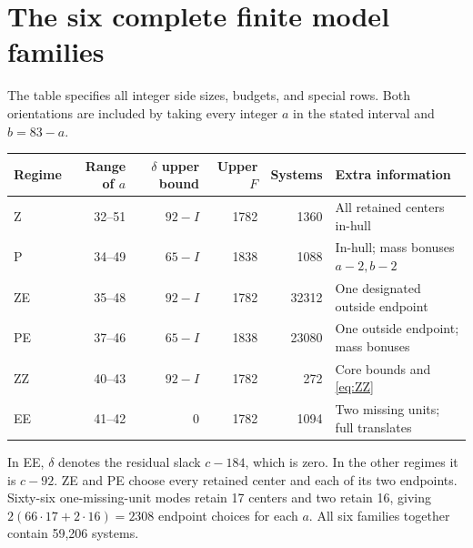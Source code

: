 \documentclass[11pt,a4paper]{article}
\begin{document}
\section{The six complete finite model families}
The table specifies all integer side sizes, budgets, and special rows.
Both orientations are included by taking every integer $a$ in the stated
interval and $b=83-a$.
\begin{center}\small
\begin{tabular}{lrrrrl}
\toprule
Regime&Range of $a$&$\delta$ upper bound&Upper $F$&Systems&Extra information\\
\midrule
Z&32--51&$92-I$&1782&1360&All retained centers in-hull\\
P&34--49&$65-I$&1838&1088&In-hull; mass bonuses $a-2,b-2$\\
ZE&35--48&$92-I$&1782&32312&One designated outside endpoint\\
PE&37--46&$65-I$&1838&23080&One outside endpoint; mass bonuses\\
ZZ&40--43&$92-I$&1782&272&Core bounds and \eqref{eq:ZZ}\\
EE&41--42&0&1782&1094&Two missing units; full translates\\
\bottomrule
\end{tabular}
\end{center}
In EE, $\delta$ denotes the residual slack $c-184$, which is zero.
In the other regimes it is $c-92$.
ZE and PE choose every retained center and each of its two endpoints.
Sixty-six one-missing-unit modes retain 17 centers and two retain 16,
giving $2(66\cdot17+2\cdot16)=2308$ endpoint choices for each $a$.
All six families together contain 59,206 systems.
\end{document}

